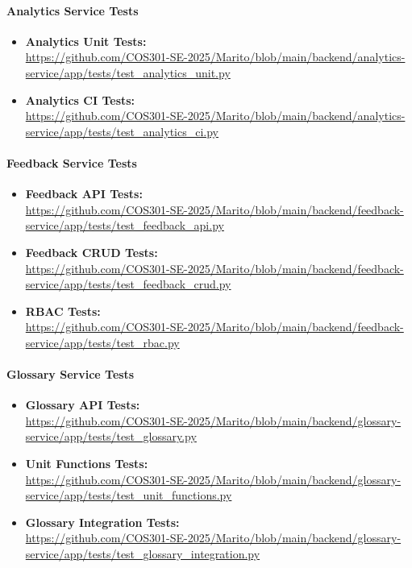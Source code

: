 \documentclass[12pt,a4paper]{article}
\begin{document}
\paragraph{Analytics Service Tests}
\begin{itemize}
    \item \textbf{Analytics Unit Tests:} \\
    \url{https://github.com/COS301-SE-2025/Marito/blob/main/backend/analytics-service/app/tests/test_analytics_unit.py}
    
    \item \textbf{Analytics CI Tests:} \\
    \url{https://github.com/COS301-SE-2025/Marito/blob/main/backend/analytics-service/app/tests/test_analytics_ci.py}
\end{itemize}

\paragraph{Feedback Service Tests}
\begin{itemize}
    \item \textbf{Feedback API Tests:} \\
    \url{https://github.com/COS301-SE-2025/Marito/blob/main/backend/feedback-service/app/tests/test_feedback_api.py}
    
    \item \textbf{Feedback CRUD Tests:} \\
    \url{https://github.com/COS301-SE-2025/Marito/blob/main/backend/feedback-service/app/tests/test_feedback_crud.py}
    
    \item \textbf{RBAC Tests:} \\
    \url{https://github.com/COS301-SE-2025/Marito/blob/main/backend/feedback-service/app/tests/test_rbac.py}
\end{itemize}

\paragraph{Glossary Service Tests}
\begin{itemize}
    \item \textbf{Glossary API Tests:} \\
    \url{https://github.com/COS301-SE-2025/Marito/blob/main/backend/glossary-service/app/tests/test_glossary.py}
    
    \item \textbf{Unit Functions Tests:} \\
    \url{https://github.com/COS301-SE-2025/Marito/blob/main/backend/glossary-service/app/tests/test_unit_functions.py}
    
    \item \textbf{Glossary Integration Tests:} \\
    \url{https://github.com/COS301-SE-2025/Marito/blob/main/backend/glossary-service/app/tests/test_glossary_integration.py}
\end{itemize}
\end{document}
